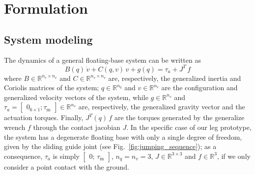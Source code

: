 \section{Formulation}\label{sec:formulation}
\subsection{System modeling}
The dynamics of a general floating-base system can be written as
\begin{equation}\label{eq:rigid_body_dyn}
B(q)\,\dot{v} +C(q, v)\,v + g(q) = \tau_{a} + J^T\,f
\end{equation}
where $B\in\mathbb{R}^{n_v\times n_v}$ and $C\in\mathbb{R}^{n_v\times n_v}$ are, respectively, the generalized inertia and Coriolis matrices of the system; $q\in\mathbb{R}^{n_q}$ and $v\in\mathbb{R}^{n_v}$ are the configuration and generalized velocity vectors of the system, while $g\in\mathbb{R}^{n_v}$ and $\tau_a=\begin{bmatrix}
0_{6\times 1};
\tau_{\mathrm{m}}
\end{bmatrix}\in\mathbb{R}^{n_v}$ are, respectively, the generalized gravity vector and the actuation torques. Finally, $J^T(q)\,f$ are the torques generated by the generalize wrench $f$ through the contact jacobian $J$. In the specific case of our leg prototype, the system has a degenerate floating base with only a single degree of freedom, given by the sliding guide joint (see Fig.~\ref{fig:jumping_sequence}); as a consequence, $\tau_a$ is simply $\begin{bmatrix}
0;\,\tau_{\mathrm{m}}\end{bmatrix}$, $n_q = n_v = 3$, $J\in\mathbb{R}^{3\times 3}$ and $f\in\mathbb{R}^3$, if we only consider a point contact with the ground.
